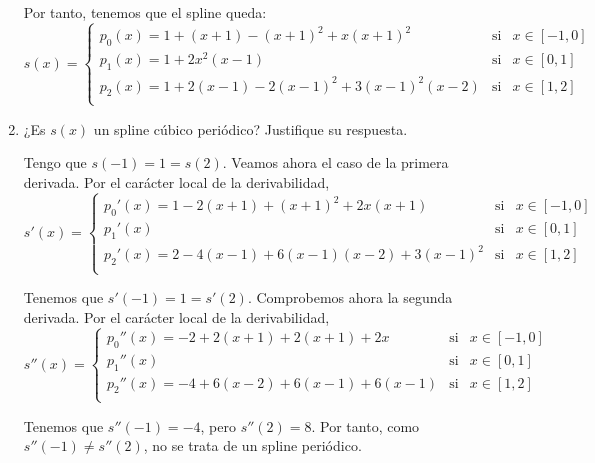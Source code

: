 \begin{ejercicio}
\begin{enumerate}
        Por tanto, tenemos que el spline queda:
        \begin{equation*}
            s(x)=\left\{\begin{array}{lll}
                p_0(x)=1+(x+1)-(x+1)^2+x(x+1)^2 & \text{si} & x\in [-1, 0] \\
                p_1(x)=1+2x^2(x-1) & \text{si} & x\in [0,1] \\
                p_2(x)=1+2(x-1)-2(x-1)^2+3(x-1)^2(x-2) & \text{si} & x\in [1,2] \\
            \end{array} \right.
        \end{equation*}

        \item ¿Es $s(x)$ un spline cúbico periódico? Justifique su respuesta.

        Tengo que $s(-1)=1=s(2)$. Veamos ahora el caso de la primera derivada. Por el carácter local de la derivabilidad,
        \begin{equation*}
            s'(x)=\left\{\begin{array}{lll}
                p_0'(x)=1-2(x+1)+(x+1)^2 +2x(x+1) & \text{si} & x\in [-1, 0] \\
                p_1'(x) & \text{si} & x\in [0,1] \\
                p_2'(x)=2-4(x-1)+6(x-1)(x-2) +3(x-1)^2 & \text{si} & x\in [1,2] \\
            \end{array} \right.
        \end{equation*}

        Tenemos que $s'(-1)=1=s'(2)$. Comprobemos ahora la segunda derivada. Por el carácter local de la derivabilidad,
        \begin{equation*}
            s''(x)=\left\{\begin{array}{lll}
                p_0''(x)=-2+2(x+1) +2(x+1)+2x & \text{si} & x\in [-1, 0] \\
                p_1''(x) & \text{si} & x\in [0,1] \\
                p_2''(x)=-4+6(x-2) +6(x-1) +6(x-1) & \text{si} & x\in [1,2] \\
            \end{array} \right.
        \end{equation*}

        Tenemos que $s''(-1)=-4$, pero $s''(2)=8$. Por tanto, como $s''(-1)\neq s''(2)$, no se trata de un spline periódico.
    \end{enumerate}
\end{ejercicio}

